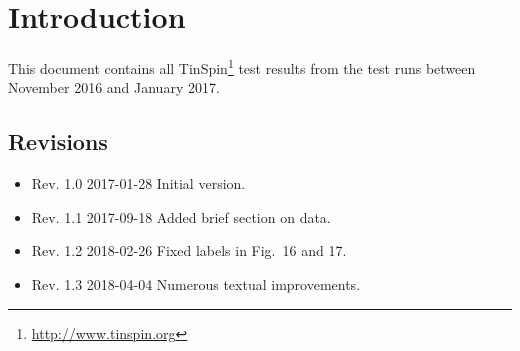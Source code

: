 \documentclass{vldb}
\makeatletter
\def\doi#1{\gdef\@doi{#1}}\def\@doi{}
\makeatother
\begin{document}
\date{17 January 2017}






\maketitle


\section{Introduction}

This document contains all TinSpin\footnote{\url{http://www.tinspin.org}} test results from the test runs between November 2016 and January 2017.

\subsection{Revisions}

\begin{itemize}
	\item Rev. 1.0 2017-01-28 Initial version.
	\item Rev. 1.1 2017-09-18 Added brief section on data.
	\item Rev. 1.2 2018-02-26 Fixed labels in Fig.~16 and 17.
	\item Rev. 1.3 2018-04-04 Numerous textual improvements. 
\end{itemize}
\end{document}

